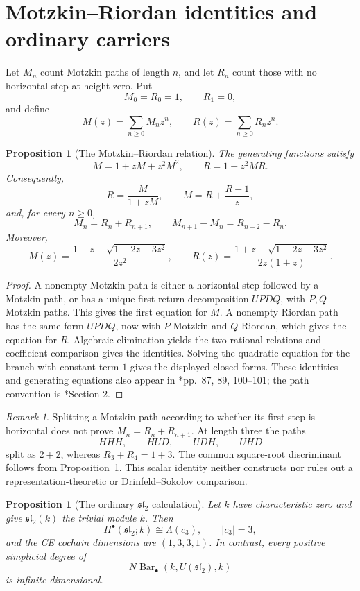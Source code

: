 \documentclass[11pt,reqno]{amsart}
\newtheorem{proposition}[theorem]{Proposition}
\theoremstyle{definition}
\theoremstyle{remark}
\newtheorem{remark}[theorem]{Remark}
\newcommand{\Barc}{\operatorname{Bar}}
\begin{document}
\section{Motzkin--Riordan identities and ordinary carriers}

Let \(M_n\) count Motzkin paths of length \(n\), and let \(R_n\) count
those with no horizontal step at height zero.  Put
\[
 M_0=R_0=1,\qquad R_1=0,
\]
and define
\[
 M(z)=\sum_{n\ge0}M_nz^n,\qquad
 R(z)=\sum_{n\ge0}R_nz^n.
\]

\begin{proposition}[The Motzkin--Riordan relation]
\label{prop:motzkin-riordan}
The generating functions satisfy
\[
 M=1+zM+z^2M^2,\qquad R=1+z^2MR.
\]
Consequently,
\[
 R=\frac{M}{1+zM},\qquad
 M=R+\frac{R-1}{z},
\]
and, for every \(n\ge0\),
\[
 M_n=R_n+R_{n+1},\qquad
 M_{n+1}-M_n=R_{n+2}-R_n.
\]
Moreover,
\[
 M(z)=\frac{1-z-\sqrt{1-2z-3z^2}}{2z^2},
\qquad
 R(z)=\frac{1+z-\sqrt{1-2z-3z^2}}{2z(1+z)}.
\]
\end{proposition}

\begin{proof}
A nonempty Motzkin path is either a horizontal step followed by a
Motzkin path, or has a unique first-return decomposition \(UPDQ\), with
\(P,Q\) Motzkin paths.  This gives the first equation for \(M\).  A
nonempty Riordan path has the same form \(UPDQ\), now with \(P\)
Motzkin and \(Q\) Riordan, which gives the equation for \(R\).
Algebraic elimination yields the two rational relations and coefficient
comparison gives the identities.  Solving the quadratic equation for
the branch with constant term \(1\) gives the displayed closed forms.
These identities and generating equations also appear in
\cite{Ber99}*{pp.~87, 89, 100--101}; the path convention is
\cite{CDY08}*{Section 2}.
\end{proof}

\begin{remark}
Splitting a Motzkin path according to whether its first step is
horizontal does not prove \(M_n=R_n+R_{n+1}\).  At length three the
paths
\[
 HHH,\qquad HUD,\qquad UDH,\qquad UHD
\]
split as \(2+2\), whereas \(R_3+R_4=1+3\).  The common square-root
discriminant follows from Proposition~\ref{prop:motzkin-riordan}.  This
scalar identity neither constructs nor rules out a
representation-theoretic or Drinfeld--Sokolov comparison.
\end{remark}

\begin{proposition}[The ordinary \(\mathfrak{sl}_2\) calculation]
\label{prop:sl2}
Let \(k\) have characteristic zero and give
\(\mathfrak{sl}_2(k)\) the trivial module \(k\).  Then
\[
 H^\bullet(\mathfrak{sl}_2;k)\cong\Lambda(c_3),
 \qquad |c_3|=3,
\]
and the CE cochain dimensions are \((1,3,3,1)\).  In contrast, every
positive simplicial degree of
\[
 N\Barc_\bullet(k,U(\mathfrak{sl}_2),k)
\]
is infinite-dimensional.
\end{proposition}
\end{document}

